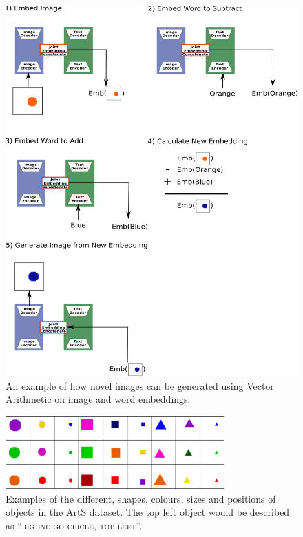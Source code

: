 \begin{figure}
\centering
\includegraphics[width=\textwidth]{Figs/shapes/vectorArthExmp.png}
\caption{An example of how novel images can be generated using Vector Arithmetic on image and word embeddings.}
\label{fig:vectorArthexmp}
\end{figure}

\begin{figure}
\centering
\includegraphics[width=0.75\textwidth]{Figs/shapes/shapes.png}
\caption{Examples of the different, shapes, colours, sizes and positions of objects in the ArtS dataset. The top left object would be described as ``\textsc{big indigo circle, top left}''.}
\label{fig:shapes}
\end{figure}

